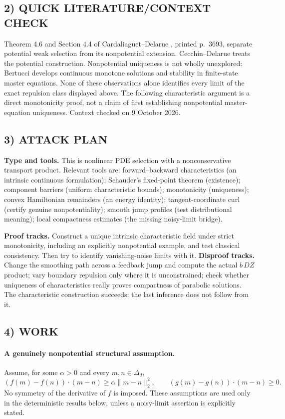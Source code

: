 \documentclass[11pt,a4paper]{article}
\theoremstyle{definition}
\theoremstyle{remark}
\begin{document}
\subsection*{2) QUICK LITERATURE/CONTEXT CHECK}
Theorem 4.6 and Section 4.4 of Cardaliaguet--Delarue \cite{cardaliaguet-delarue}, printed p.~3693, separate potential weak selection from its nonpotential extension. Cecchin--Delarue \cite{cecchin-delarue} treats the potential construction. Nonpotential uniqueness is not wholly unexplored: Bertucci \cite{bertucci} develops continuous monotone solutions and stability in finite-state master equations. None of these observations alone identifies every limit of the exact repulsion class displayed above. The following characteristic argument is a direct monotonicity proof, not a claim of first establishing nonpotential master-equation uniqueness. Context checked on 9 October 2026.

\subsection*{3) ATTACK PLAN}
\textbf{Type and tools.} This is nonlinear PDE selection with a nonconservative transport product. Relevant tools are: forward--backward characteristics (an intrinsic continuous formulation); Schauder's fixed-point theorem (existence); component barriers (uniform characteristic bounds); monotonicity (uniqueness); convex Hamiltonian remainders (an energy identity); tangent-coordinate curl (certify genuine nonpotentiality); smooth jump profiles (test distributional meaning); local compactness estimates (the missing noisy-limit bridge).

\textbf{Proof tracks.} Construct a unique intrinsic characteristic field under strict monotonicity, including an explicitly nonpotential example, and test classical consistency. Then try to identify vanishing-noise limits with it. \textbf{Disproof tracks.} Change the smoothing path across a feedback jump and compute the actual $b\,DZ$ product; vary boundary repulsion only where it is unconstrained; check whether uniqueness of characteristics really proves compactness of parabolic solutions. The characteristic construction succeeds; the last inference does not follow from it.

\subsection*{4) WORK}
\paragraph{A genuinely nonpotential structural assumption.}
Assume, for some $\alpha>0$ and every $m,n\in\Delta_d$,
\[
 (f(m)-f(n))\cdot(m-n)\geq\alpha\|m-n\|_2^2,
 \qquad (g(m)-g(n))\cdot(m-n)\geq0. \tag{MON}
\]
No symmetry of the derivative of $f$ is imposed. These assumptions are used only in the deterministic results below, unless a noisy-limit assertion is explicitly stated.
\end{document}
